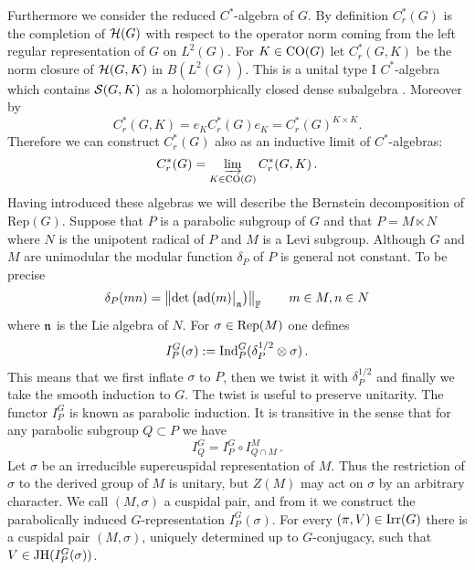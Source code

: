Furthermore we consider the reduced $C^*$-algebra of $G$. By
definition $C_r^* (G)$ is the completion of $\mathcal H (G)$ with
respect to the operator norm coming from the left regular
representation of $G$ on $L^2 (G)$. For $K \in \mathrm{CO}(G)$ let
$C_r^* (G,K)$ be the norm closure of $\mathcal H (G,K)$ in $B(L^2 (G))$. 
This is a unital type I $C^*$-algebra which contains $\mathcal S
(G,K)$ as a holomorphically closed dense subalgebra 
\cite[Theorem 29]{Vig}. Moreover by \cite[p. 53]{SSZ}
\begin{equation}
C_r^* (G,K) = e_K C_r^* (G) e_K = C_r^* (G)^{K \times K} .
\end{equation}
Therefore we can construct $C_r^* (G)$ also as an inductive limit
of $C^*$-algebras:
\begin{equation}\label{eq:2.14}
C_r^* (G) = \varinjlim_{K \in \mathrm{CO}(G)} C_r^* (G,K) \,.
\end{equation}
Having introduced these algebras we will describe the Bernstein
decomposition of Rep$ (G)$.
Suppose that $P$ is a parabolic subgroup of $G$ and that $P = M 
\ltimes N$ where $N$ is the unipotent radical of $P$ and $M$ is a Levi
subgroup. Although $G$ and $M$ are unimodular the modular function
$\delta_P$ of $P$ is general not constant. To be precise
\begin{equation}
\delta_P (m n) = \left\| \det \big( \mathrm{ad}(m) \big|_{\mathfrak n} \big)
 \right\|_{\mathbb F} \qquad m \in M , n \in N
\end{equation}
where $\mathfrak n$ is the Lie algebra of $N$. For $\sigma \in \mathrm{Rep}(M)$ one defines
\[
I_P^G (\sigma ) := \mathrm{Ind}_P^G (\delta_P^{1/2} \otimes \sigma ) \,.
\]
This means that we first inflate $\sigma$ to $P$, then we twist it with $\delta_P^{1/2}$ 
and finally we take the smooth induction to $G$. The twist is useful to preserve unitarity. 
The functor $I_P^G$ is known as parabolic induction. It is transitive in the sense that 
for any parabolic subgroup $Q \subset P$  we have 
\[
I_Q^G = I_P^G \circ I^M_{Q \cap M} \,.
\]
Let $\sigma$ be an irreducible supercuspidal representation of $M$. Thus
the restriction of $\sigma$ to the derived group of $M$ is unitary, but $Z(M)$
may act on $\sigma$ by an arbitrary character. We call $(M,\sigma )$ a cuspidal 
pair, and from it we construct the parabolically induced $G$-representation 
$I_P^G (\sigma )$. For every $(\pi ,V) \in \mathrm{Irr} (G)$ there is a cuspidal pair 
$(M, \sigma )$, uniquely determined up to $G$-conjugacy, such that 
$V \in \mathrm{JH} (I_P^G (\sigma ) )$.

